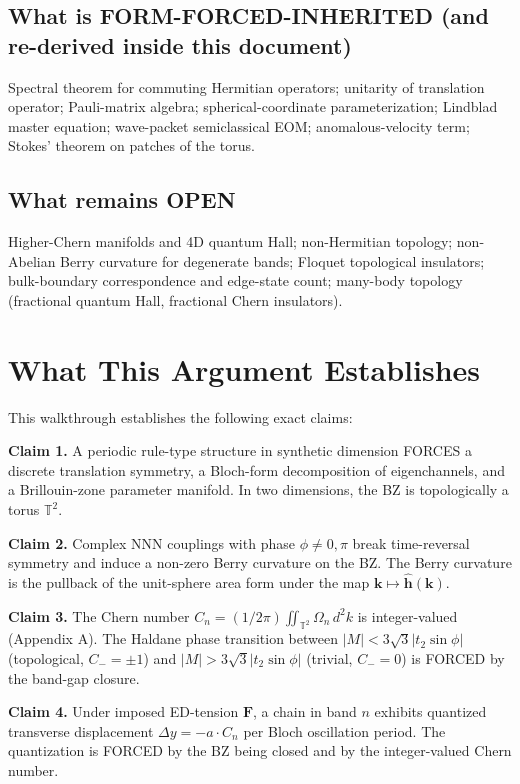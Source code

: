 \documentclass[11pt,a4paper]{article}
\begin{document}
\subsection*{What is FORM-FORCED-INHERITED (and re-derived inside this document)}

Spectral theorem for commuting Hermitian operators; unitarity of translation operator; Pauli-matrix algebra; spherical-coordinate parameterization; Lindblad master equation; wave-packet semiclassical EOM; anomalous-velocity term; Stokes' theorem on patches of the torus.

\subsection*{What remains OPEN}

Higher-Chern manifolds and 4D quantum Hall; non-Hermitian topology; non-Abelian Berry curvature for degenerate bands; Floquet topological insulators; bulk-boundary correspondence and edge-state count; many-body topology (fractional quantum Hall, fractional Chern insulators).

\section{What This Argument Establishes}

This walkthrough establishes the following exact claims:

\textbf{Claim 1.} A periodic rule-type structure in synthetic dimension FORCES a discrete translation symmetry, a Bloch-form decomposition of eigenchannels, and a Brillouin-zone parameter manifold. In two dimensions, the BZ is topologically a torus $\mathbb{T}^2$.

\textbf{Claim 2.} Complex NNN couplings with phase $\phi \neq 0, \pi$ break time-reversal symmetry and induce a non-zero Berry curvature on the BZ. The Berry curvature is the pullback of the unit-sphere area form under the map $\mathbf{k}\mapsto\hat{\mathbf{h}}(\mathbf{k})$.

\textbf{Claim 3.} The Chern number $C_n = (1/2\pi)\iint_{\mathbb{T}^2}\Omega_n\, d^2k$ is integer-valued (Appendix A). The Haldane phase transition between $|M| < 3\sqrt{3}|t_2\sin\phi|$ (topological, $C_- = \pm 1$) and $|M| > 3\sqrt{3}|t_2\sin\phi|$ (trivial, $C_- = 0$) is FORCED by the band-gap closure.

\textbf{Claim 4.} Under imposed ED-tension $\mathbf{F}$, a chain in band $n$ exhibits quantized transverse displacement $\Delta y = -a\cdot C_n$ per Bloch oscillation period. The quantization is FORCED by the BZ being closed and by the integer-valued Chern number.
\end{document}
